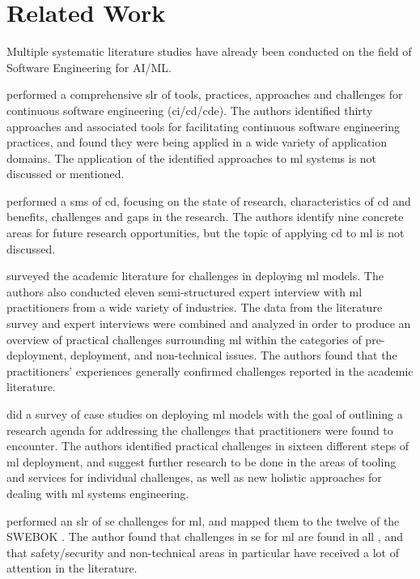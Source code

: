 \chapter{Related Work}
\label{ch:related_work}
Multiple systematic literature studies have already been conducted on the field of Software Engineering for AI/ML.

\textcite{Shahin2017} performed a comprehensive \acrfull{slr} of tools, practices, approaches and challenges for continuous software engineering (\acrshort{ci}/\acrshort{cd}/\acrshort{cde}).
The authors identified thirty approaches and associated tools for facilitating continuous software engineering practices, and found they were being applied in a wide variety of application domains.
The application of the identified approaches to \acrshort{ml} systems is not discussed or mentioned.

\textcite{Rodriguez2017} performed a \acrfull{sms} of \acrshort{cd}, focusing on the state of research, characteristics of \acrshort{cd} and benefits, challenges and gaps in the research.
The authors identify nine concrete areas for future research opportunities, but the topic of applying \acrshort{cd} to \acrshort{ml} is not discussed.

\textcite{Baier2019} surveyed the academic literature for challenges in deploying \acrshort{ml} models.
The authors also conducted eleven semi-structured expert interview with \acrshort{ml} practitioners from a wide variety of industries.
The data from the literature survey and expert interviews were combined and analyzed in order to produce an overview of practical challenges surrounding \acrshort{ml} within the categories of pre-deployment, deployment, and non-technical issues.
The authors found that the practitioners' experiences generally confirmed challenges reported in the academic literature.

\textcite{Paleyes2020} did a survey of case studies on deploying \acrshort{ml} models with the goal of outlining a research agenda for addressing the challenges that practitioners were found to encounter.
The authors identified practical challenges in sixteen different steps of \acrshort{ml} deployment, and suggest further research to be done in the areas of tooling and services for individual challenges, as well as new holistic approaches for dealing with \acrshort{ml} systems engineering.

\textcite{Kumeno2020} performed an \acrshort{slr} of \acrshort{se} challenges for \acrshort{ml}, and mapped them to the twelve  of the SWEBOK \cite{Bourque2014}.
The author found that challenges in \acrshort{se} for \acrshort{ml} are found in all , and that safety/security and non-technical areas in particular have received a lot of attention in the literature.

